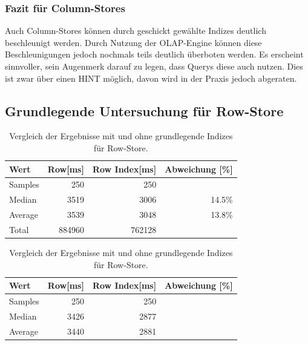 \subsubsection{Fazit für Column-Stores}
Auch Column-Stores können durch geschickt gewählte Indizes deutlich beschleunigt werden. Durch Nutzung der OLAP-Engine können diese Beschleunigungen jedoch nochmals teils deutlich überboten werden. 
Es erscheint sinnvoller, sein Augenmerk darauf zu legen, dass Querys diese auch nutzen. Dies ist zwar über einen HINT möglich, davon wird in der Praxis jedoch abgeraten.

\subsection{Grundlegende Untersuchung für Row-Store}

\begin{table}[H]
    \begin{tabularx}{\textwidth}{lrrr}
        \toprule
        Wert                & Row[ms] & Row Index[ms]   & Abweichung [\%]\\
        \toprule
        Samples             & 250      & 250            &       \\
        \midrule
        Median              & 3519     & 3006           &  14.5\%     \\
        Average             & 3539     & 3048           &  13.8\%     \\
        Total               & 884960   & 762128         &       \\ 
        \bottomrule
    \end{tabularx}
\caption{Vergleich der Ergebnisse mit und ohne grundlegende Indizes für Row-Store.}
\label{tab:basic_index_row}
\end{table}





\begin{table}[H]
    \begin{tabularx}{\textwidth}{lrrr}
        \toprule
        Wert                & Row[ms] & Row Index[ms]   & Abweichung [\%]\\
        \toprule
        Samples             & 250     &  250            &       \\
        \midrule
        Median              & 3426    &  2877           &       \\
        Average             & 3440    &  2881           &       \\
        \bottomrule
    \end{tabularx}
\caption{Vergleich der Ergebnisse mit und ohne grundlegende Indizes für Row-Store.}
\label{tab:basic_index_row}
\end{table}

